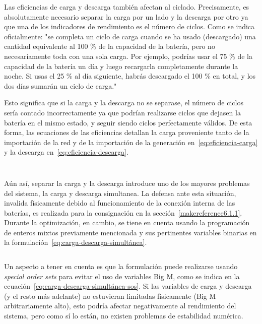 Las eficiencias de carga y descarga también afectan al ciclado. Precisamente, es absolutamente necesario separar la carga por un lado y la descarga por otro ya que una de los indicadores de rendimiento es el número de ciclos. Como se indica oficialmente: "se completa un ciclo de carga cuando se ha usado (descargado) una cantidad equivalente al 100 \% de la capacidad de la batería, pero no necesariamente toda con una sola carga. Por ejemplo, podrías usar el 75 \% de la capacidad de la batería un día y luego recargarla completamente durante la noche. Si usas el 25 \% al día siguiente, habrás descargado el 100 \% en total, y los dos días sumarán un ciclo de carga."

Esto significa que si la carga y la descarga no se separase, el número de ciclos sería contado incorrectamente ya que podrían realizarse ciclos que dejasen la batería en el mismo estado, y seguir siendo ciclos perfectamente válidos. De esta forma, las ecuaciones de las eficiencias detallan la carga proveniente tanto de la importación de la red y de la importación de la generación en~\ref{eq:eficiencia-carga} y la descarga en~\ref{eq:eficiencia-descarga}.

\begin{equation}
  \label{eq:eficiencia-carga}
\end{equation}

\begin{equation}
  \label{eq:eficiencia-descarga}
\end{equation}

Aún así, separar la carga y la descarga introduce uno de los mayores problemas del sistema, la carga y descarga simultanea. La defensa ante esta situación, invalida físicamente debido al funcionamiento de la conexión interna de las baterías, es realizada para la consignación en la sección~\ref{makereference6.1.1}. Durante la optimización, en cambio, se tiene en cuenta usando la programación de enteros mixtos previamente mencionada y sus pertinentes variables binarias en la formulación~\ref{eq:carga-descarga-simultánea}.

\begin{equation}
  \label{eq:carga-descarga-simultánea}
\end{equation}

Un aspecto a tener en cuenta es que la formulación puede realizarse usando \textit{special order sets} para evitar el uso de variables Big M, como se indica en la ecuación~\ref{eq:carga-descarga-simultánea-sos}. Si las variables de carga y descarga (y el resto más adelante) no estuvieran limitadas físicamente (Big M arbitrariamente alto), esto podría afectar negativamente al rendimiento del sistema, pero como sí lo están, no existen problemas de estabilidad numérica.

